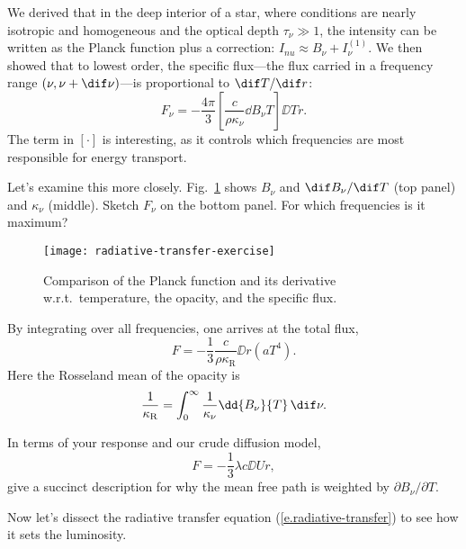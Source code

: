 
\newcommand*{\binom}[3]{\ensuremath{\prob_{#1}(#2;#3)}}
\newcommand*{\prob}{\ensuremath{\mathcal{P}}}
\newcommand*{\mean}[1]{\ensuremath{\left\langle#1\right\rangle}}

We derived that in the deep interior of a star, where conditions are nearly isotropic and homogeneous and the optical depth $\tau_{\nu}\gg 1$, the intensity can be written as the Planck function plus a correction: $I_{nu}
\approx B_{\nu} + I_{\nu}^{(1)}$.  We then showed that to lowest order, the specific flux---the flux carried in a frequency range $(\nu,\nu+\dif\nu)$---is proportional to $\dif T/\dif r$:
\[
	F_{\nu} = -\frac{4\pi}{3}\left[\frac{c}{\rho\kappa_{\nu}}\dd{B_{\nu}}{T}\right]\DD{T}{r}.
\]
The term in $\left[\cdot\right]$ is interesting, as it controls which frequencies are most responsible for energy transport.

Let's examine this more closely. Fig.~\ref{f.planck} shows $B_{\nu}$ and $\dif B_{\nu}/\dif T$ (top panel) and $\kappa_{\nu}$ (middle). Sketch $F_{\nu}$ on the bottom panel.  For which frequencies is it maximum?

\begin{figure}[htbp]
\texttt{[image: radiative-transfer-exercise]}
\caption{\label{f.planck} Comparison of the Planck function and its derivative w.r.t.\ temperature, the opacity, and the specific flux.}
\end{figure}

By integrating over all frequencies, one arrives at the total flux,
\begin{equation}\label{e.radiative-transfer}
	F = -\frac{1}{3}\frac{c}{\rho\kappa_{\mathrm{R}}}\DD{}{r}\left(a T^{4}\right).
\end{equation}
Here the Rosseland mean of the opacity is
\begin{equation}\label{e.rosseland-opacity}
	\frac{1}{\kappa_{\mathrm{R}}} = \int_{0}^{\infty} \frac{1}{\kappa_{\nu}}\dd{B_{\nu}}{T}\,\dif\nu.
\end{equation}

In terms of your response and our crude diffusion model,
\[
	F = -\frac{1}{3}\lambda c\DD{U}{r},
\]
give a succinct description for why the mean free path is weighted by $\partial B_{\nu}/\partial T$.

Now let's dissect the radiative transfer equation (\ref{e.radiative-transfer}) to see how it sets the luminosity.  

